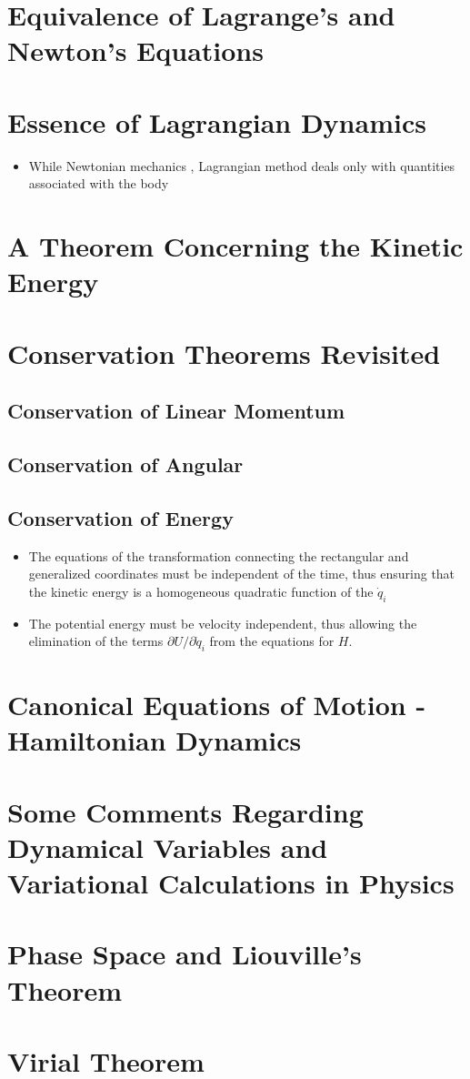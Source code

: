 \documentclass[]{article}
\begin{document}
\section{Equivalence of Lagrange's and Newton's Equations}
\section{Essence of Lagrangian Dynamics}
\begin{itemize}
\item While Newtonian mechanics , Lagrangian method deals only with quantities associated with the body
\end{itemize}
\section{A Theorem Concerning the Kinetic Energy}
\section{Conservation Theorems Revisited}
\subsection{Conservation of Linear Momentum}
\subsection{Conservation of Angular}
\subsection{Conservation of Energy}
\begin{itemize}
	\item The equations of the transformation connecting the rectangular and generalized coordinates must be independent of the time, thus ensuring that the kinetic energy is a homogeneous quadratic function of the $\dot{q}_{i}$
	\item The potential energy must be velocity independent, thus allowing the elimination of the terms $\partial U / \partial \dot{q}_{i}$ from the equations for $H$.
\end{itemize}
\section{Canonical Equations of Motion - Hamiltonian Dynamics}
\section{Some Comments Regarding Dynamical Variables and Variational Calculations in Physics}
\section{Phase Space and Liouville's Theorem}
\section{Virial Theorem}
\end{document}
